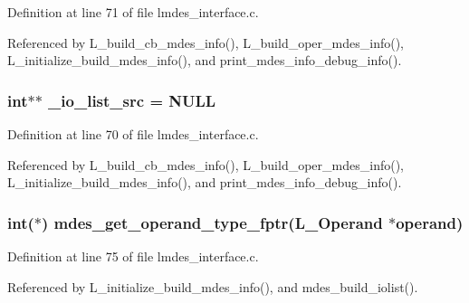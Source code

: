 Definition at line 71 of file lmdes\_\-interface.c.

Referenced by L\_\-build\_\-cb\_\-mdes\_\-info(), L\_\-build\_\-oper\_\-mdes\_\-info(), L\_\-initialize\_\-build\_\-mdes\_\-info(), and print\_\-mdes\_\-info\_\-debug\_\-info().
\subsubsection{\setlength{\rightskip}{0pt plus 5cm}int$\ast$$\ast$ \bf{\_\-io\_\-list\_\-src} = \bf{NULL}\hspace{0.3cm}{\tt  [static]}}\label{lmdes__interface_8c_bab5cb455004fc793810600adc9f8eb1}




Definition at line 70 of file lmdes\_\-interface.c.

Referenced by L\_\-build\_\-cb\_\-mdes\_\-info(), L\_\-build\_\-oper\_\-mdes\_\-info(), L\_\-initialize\_\-build\_\-mdes\_\-info(), and print\_\-mdes\_\-info\_\-debug\_\-info().
\subsubsection{\setlength{\rightskip}{0pt plus 5cm}int($\ast$) \bf{mdes\_\-get\_\-operand\_\-type\_\-fptr}(L\_\-Operand $\ast$operand)\hspace{0.3cm}{\tt  [static]}}\label{lmdes__interface_8c_6144d11657dc1f19d101c23f1767fe3b}




Definition at line 75 of file lmdes\_\-interface.c.

Referenced by L\_\-initialize\_\-build\_\-mdes\_\-info(), and mdes\_\-build\_\-iolist().